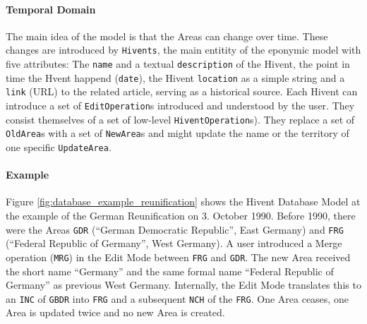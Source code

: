 
\paragraph{Temporal Domain} %
\label{par:temporal_domain}

The main idea of the model is that the Areas can change over time. These changes are introduced by \texttt{Hivents}, the main entitity of the eponymic model with five attributes: The \texttt{name} and a textual \texttt{description} of the Hivent, the point in time the Hvent happend (\texttt{date}), the Hivent \texttt{location} as a simple string and a \texttt{link} (URL) to the related article, serving as a historical source. Each Hivent can introduce a set of \texttt{EditOperation}s introduced and understood by the user. They consist themselves of a set of low-level \texttt{HiventOperation}s). They replace a set of \texttt{OldArea}s with a set of \texttt{NewArea}s and might update the name or the territory of one specific \texttt{UpdateArea}.


\paragraph{Example} %
\label{par:example}

Figure \ref{fig:database_example_reunification} shows the Hivent Database Model at the example of the German Reunification on 3. October 1990. Before 1990, there were the Areas \texttt{GDR} (``German Democratic Republic'', East Germany) and \texttt{FRG} (``Federal Republic of Germany'', West Germany). A user introduced a Merge operation (\texttt{MRG}) in the Edit Mode between \texttt{FRG} and \texttt{GDR}. The new Area received the short name ``Germany'' and the same formal name ``Federal Republic of Germany'' as previous West Germany. Internally, the Edit Mode translates this to an \texttt{INC} of \texttt{GBDR} into \texttt{FRG} and a subsequent \texttt{NCH} of the \texttt{FRG}. One Area ceases, one Area is updated twice and no new Area is created.

